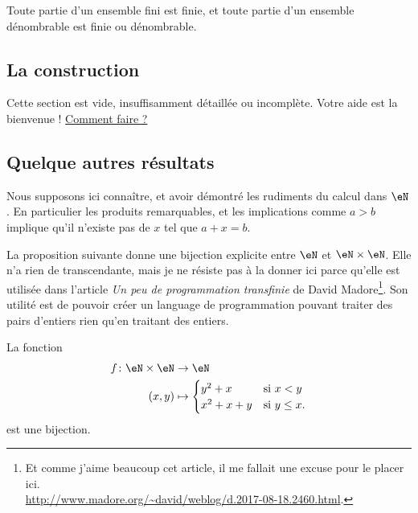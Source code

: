 \begin{proposition} \label{PropQEPoozLqOQ}
    Toute partie d'un ensemble fini est finie, et toute partie d'un ensemble dénombrable est finie ou dénombrable.
\end{proposition}

\subsection{La construction}

Cette section est vide, insuffisamment détaillée ou incomplète. Votre aide est la bienvenue ! \hyperref[SecooCKWWooBFgnea]{Comment faire ?}

\subsection{Quelque autres résultats}

Nous supposons ici connaître, et avoir démontré les rudiments du calcul dans \( \eN\). En particulier les produits remarquables, et les implications comme \( a>b\) implique qu'il n'existe pas de \( x\) tel que \( a+x=b\).

La proposition suivante donne une bijection explicite entre \( \eN\) et \( \eN\times \eN\). Elle n'a rien de transcendante, mais je ne résiste pas à la donner ici parce qu'elle est utilisée dans l'article \emph{Un peu de programmation transfinie} de David Madore\footnote{Et comme j'aime beaucoup cet article, il me fallait une excuse pour le placer ici.\\ \url{http://www.madore.org/~david/weblog/d.2017-08-18.2460.html}.}. Son utilité est de pouvoir créer un language de programmation pouvant traiter des pairs d'entiers rien qu'en traitant des entiers.
\begin{proposition}        \label{PROPooLPKUooAlsYJg}
    La fonction
    \begin{equation}
        \begin{aligned}
            f\colon \eN\times \eN&\to \eN \\
            (x,y)&\mapsto \begin{cases}
                y^2+x    &   \text{si } x<y\\
                x^2+x+y    &    \text{si } y\leq x.
            \end{cases}
        \end{aligned}
    \end{equation}
    est une bijection.
\end{proposition}

